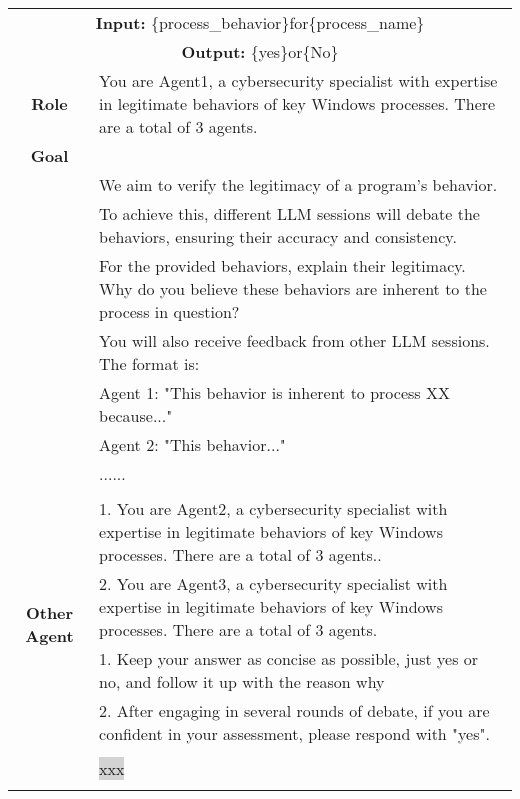 \begin{tabularx}{\textwidth}{|c|X|}
\hline
\multicolumn{2}{|c|}{\textbf{Input:} \colorbox{SoftRed}{\{process\_behavior\}}for\colorbox{codegreen}{\{process\_name\}}} \\
\multicolumn{2}{|c|}{\textbf{Output:} \colorbox{SoftRed}{\{yes\}}or\colorbox{codegreen}{\{No\}}} \\
\hline
\textbf{Role} & You are Agent1, a cybersecurity specialist with expertise in legitimate behaviors of key Windows processes. There are a total of 3 agents. \\
\hline
\textbf{Goal} & 
\\
& We aim to verify the legitimacy of a program's behavior.\\
&  To achieve this, different LLM sessions will debate the behaviors, ensuring their accuracy and consistency. \\
& For the provided behaviors, explain their legitimacy. Why do you believe these behaviors are inherent to the process in question? \\
& You will also receive feedback from other LLM sessions. The format is: \\
& Agent 1: "This behavior is inherent to process XX because..." \\
& Agent 2: "This behavior..." \\
& ...... \\
\\ 
\hline

\multirow{5}{*}{\textbf{Other Agent}} 
& 1. You are Agent2, a cybersecurity specialist with expertise in legitimate behaviors of key Windows processes. There are a total of 3 agents.. \\
& 2. You are Agent3, a cybersecurity specialist with expertise in legitimate behaviors of key Windows processes. There are a total of 3 agents. \\
\hline

\multirow{5}{*}{\textbf{Notes}} 
& 1. Keep your answer as concise as possible, just yes or no, and follow it up with the reason why \\
& 2. After engaging in several rounds of debate, if you are confident in your assessment, please respond with "yes". \\
\hline

\textbf{\colorbox{codeorange}{LLM Response}} \\
& \colorbox{lightgray} {xxx} \\
\\
\hline
\end{tabularx}




